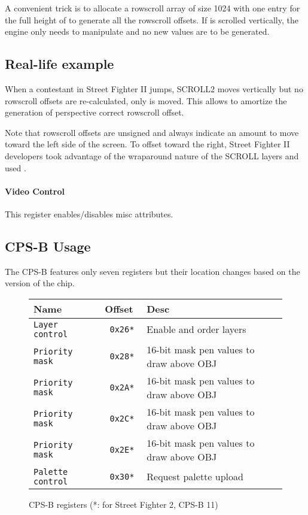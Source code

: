A convenient trick is to allocate a rowscroll array of size 1024 with one entry for the full height of  to generate all the rowscroll offsets. If  is scrolled vertically, the engine only needs to manipulate  and no new values are to be generated.

 

\subsection{Real-life example}

When a contestant in Street Fighter II jumps, SCROLL2 moves vertically but no rowscroll offsets are re-calculated, only   is moved. This allows to amortize the generation of perspective correct rowscroll offset.

Note that rowscroll offsets are unsigned and always indicate an amount to move toward the left side of the screen. To offset toward the right, Street Fighter II developers took advantage of the wraparound nature of the SCROLL layers and used .

\paragraph{Video Control} This register enables/disables misc attributes.

 

\label{cpsbreg_programming}
\subsection{CPS-B Usage}
The CPS-B features only seven registers but their location changes based on the version of the chip.

 \begin{figure}[H]
\begin{tabularx}{\textwidth}{llX}
  \toprule    
  \textbf{Name } & \textbf{ Offset }  & \textbf{Desc }\\  
  \toprule   
  \texttt{Layer control} & \texttt{ 0x26* } & Enable and order layers\\      
\texttt{Priority mask} & \texttt{ 0x28* } &  16-bit mask pen values to draw above OBJ   \\  
\texttt{Priority mask} & \texttt{ 0x2A* } &  16-bit mask pen values to draw above OBJ   \\  
\texttt{Priority mask} & \texttt{ 0x2C* } &  16-bit mask pen values to draw above OBJ   \\  
\texttt{Priority mask} & \texttt{ 0x2E* } &  16-bit mask pen values to draw above OBJ  \\  
\texttt{Palette control} & \texttt{ 0x30* } &  Request palette upload\\ 
  \toprule   
\end{tabularx}
\caption*{CPS-B registers (*: for Street Fighter 2, CPS-B 11)}
\end{figure}

